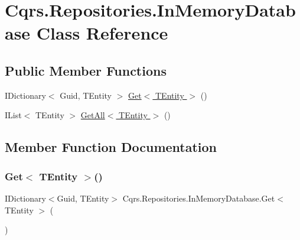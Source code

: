 \hypertarget{classCqrs_1_1Repositories_1_1InMemoryDatabase}{}\section{Cqrs.\+Repositories.\+In\+Memory\+Database Class Reference}
\label{classCqrs_1_1Repositories_1_1InMemoryDatabase}
\subsection*{Public Member Functions}
\begin{DoxyCompactItemize}
\item 
I\+Dictionary$<$ Guid, T\+Entity $>$ \hyperlink{classCqrs_1_1Repositories_1_1InMemoryDatabase_aef212725bb71dfe3a380de20843ed0e5_aef212725bb71dfe3a380de20843ed0e5}{Get$<$ T\+Entity $>$} ()
\item 
I\+List$<$ T\+Entity $>$ \hyperlink{classCqrs_1_1Repositories_1_1InMemoryDatabase_a83104b325c203f6768bb8ffd2c9c3381_a83104b325c203f6768bb8ffd2c9c3381}{Get\+All$<$ T\+Entity $>$} ()
\end{DoxyCompactItemize}


\subsection{Member Function Documentation}
\mbox{\label{classCqrs_1_1Repositories_1_1InMemoryDatabase_aef212725bb71dfe3a380de20843ed0e5_aef212725bb71dfe3a380de20843ed0e5}} 
\subsubsection{\texorpdfstring{Get$<$ T\+Entity $>$()}{Get< TEntity >()}}
{\footnotesize\ttfamily I\+Dictionary$<$Guid, T\+Entity$>$ Cqrs.\+Repositories.\+In\+Memory\+Database.\+Get$<$ T\+Entity $>$ (\begin{DoxyParamCaption}{ }\end{DoxyParamCaption})}

